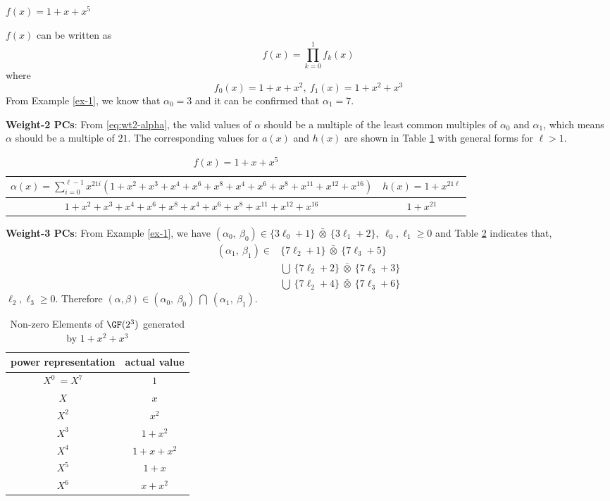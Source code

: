 \begin{example}
$f(x)=1+x+x^5$

$f(x)$ can be written as 
$$f(x)=\prod_{k=0}^{1}f_k(x)$$
where 
$$f_0(x)=1+x+x^2,~f_1(x)=1+x^2+x^3$$ 
From Example \ref{ex-1}, we know that $\alpha_0=3$ and it can be confirmed that $\alpha_1=7$.

\textbf{Weight-2 PCs}: 
From \eqref{eq:wt2-alpha}, the valid values of $\alpha$ should be a multiple of the least common multiples of $\alpha_0$ and $\alpha_1$, which means $\alpha$ should be a multiple of $21$.
The corresponding values for $a(x)$ and $h(x)$ are shown in Table \ref{novelTab1-c} with general forms for $\ell>1$.

\begin{table}[htbp]
\renewcommand{\arraystretch}{1.3}
 \caption{$f(x)=1+x+x^5$}
 \centering
\begin{tabular}{c c } 
\hline
 $\alpha(x)=\sum_{i=0}^{\ell-1} x^{21i}(1+x^2+x^3+x^4+x^6+x^8+x^{4}+x^{6}+x^{8}+x^{11}+x^{12}+x^{16})$ & $h(x)=1+x^{21\ell}$ \\ [0.5ex] 
\hline\hline
$1+x^2+x^3+x^4+x^6+x^8+x^{4}+x^{6}+x^{8}+x^{11}+x^{12}+x^{16}$ & $1+x^{21}$\\ 
\end{tabular}
 \label{novelTab1-c}
\end{table}

\textbf{Weight-3 PCs}:
From Example \ref{ex-1}, we have $(\alpha_0,~\beta_0) \in \{3\ell_0+1\}~ \bar{\otimes}~\{3\ell_1+2\},~\ell_0,\ell_1 \geq 0$
and Table \ref{novelTabWt3-5} indicates that, 
\begin{equation*}
\begin{split}
(\alpha_1,~\beta_1) \in &\{7\ell_2+1\} ~\bar{\otimes}~\{7\ell_3+5\}\\
& \bigcup~ \{7\ell_2+2\} ~\bar{\otimes}~\{7\ell_3+3\} \\
& \bigcup ~\{7\ell_2+4\} ~\bar{\otimes}~\{7\ell_3+6\} 
\end{split}
\end{equation*}
$\ell_2,\ell_3 \geq 0$. Therefore $(\alpha,\beta) \in (\alpha_0,~\beta_0)  ~\bigcap~ (\alpha_1,~\beta_1) $.

\begin{table}[htbp]
 \caption{Non-zero Elements of $\GF (2^3)$ generated by $1+x^2+x^3$}
\centering
 \begin{tabular}{c c} 
 \hline
 power representation & actual value \\ [0.5ex] 
 \hline\hline
$X^0~=X^7$ & $1$\\
\hline
$X$ & $x$\\
\hline
$X^2$ &  $x^2$\\
\hline
$X^3$ &  $1+x^2$\\
\hline
$X^4$ &  $1+x+x^2$\\
\hline
$X^5$ &  $1+x$\\
\hline
$X^6$ &  $x+x^2$\\
\hline
 \end{tabular}
 \label{novelTabWt3-5}
\end{table}


\end{example}

